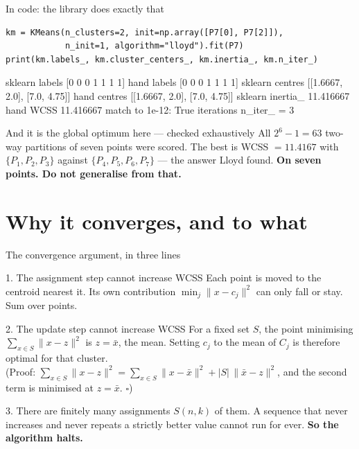 \documentclass[aspectratio=169]{beamer}
\begin{document}
\begin{frame}[fragile,shrink=6]{In code: the library does exactly that}
\begin{lstlisting}[basicstyle=\ttfamily\scriptsize]
km = KMeans(n_clusters=2, init=np.array([P7[0], P7[2]]),
            n_init=1, algorithm="lloyd").fit(P7)
print(km.labels_, km.cluster_centers_, km.inertia_, km.n_iter_)
\end{lstlisting}
\begin{outblk}
sklearn labels    [0 0 0 1 1 1 1]        hand labels  [0 0 0 1 1 1 1]
sklearn centres   [[1.6667, 2.0], [7.0, 4.75]]
hand centres      [[1.6667, 2.0], [7.0, 4.75]]
sklearn inertia_ 11.416667    hand WCSS 11.416667    match to 1e-12: True
iterations n_iter_ = 3
\end{outblk}
  \vspace{0.2em}
  \begin{alertblock}{And it is the global optimum here --- checked exhaustively}
    \centering\small
    All $2^{6}-1 = 63$ two-way partitions of seven points were scored.
    The best is WCSS $= \mathbf{11.4167}$ with
    $\{P_1,P_2,P_3\}$ against $\{P_4,P_5,P_6,P_7\}$ --- the answer Lloyd
    found. \textbf{On seven points. Do not generalise from that.}
  \end{alertblock}
\end{frame}

\section[Convergence]{Why it converges, and to what}
\label{sec:conv}

\begin{frame}[shrink=8]{The convergence argument, in three lines}
  \begin{block}{1. The assignment step cannot increase WCSS}
    \small Each point is moved to the centroid nearest it. Its own
    contribution $\min_j \lVert x - c_j\rVert^2$ can only fall or stay. Sum
    over points.
  \end{block}
  \begin{block}{2. The update step cannot increase WCSS}
    \small For a fixed set $S$, the point minimising
    $\sum_{x \in S}\lVert x - z\rVert^2$ is $z = \bar{x}$, the mean. Setting
    $c_j$ to the mean of $C_j$ is therefore optimal for that cluster.
    \\[0.2em]
    (Proof: $\sum_{x\in S}\lVert x-z\rVert^2 =
      \sum_{x\in S}\lVert x-\bar x\rVert^2 + |S|\,\lVert \bar x - z\rVert^2$,
     and the second term is minimised at $z=\bar x$. \ensuremath{\square})
  \end{block}
  \begin{exampleblock}{3. There are finitely many assignments}
    \small $S(n,k)$ of them. A sequence that never increases and never
    repeats a strictly better value cannot run for ever. \textbf{So the
    algorithm halts.}
  \end{exampleblock}
\end{frame}
\end{document}
